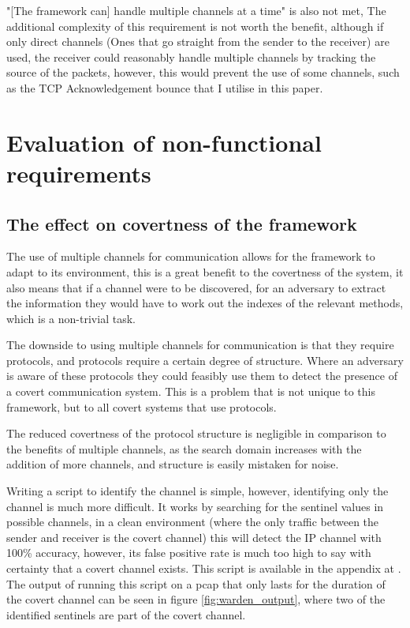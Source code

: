 "[The framework can] handle multiple channels at a time" is also not met, The additional complexity of this requirement is not worth the benefit, although if only direct channels (Ones that go straight from the sender to the receiver) are used, the receiver could reasonably handle multiple channels by tracking the source of the packets, however, this would prevent the use of some channels, such as the TCP Acknowledgement bounce that I utilise in this paper.

\section{Evaluation of non-functional requirements}

\subsection{The effect on covertness of the framework}

The use of multiple channels for communication allows for the framework to adapt to its environment, this is a great benefit to the covertness of the system, it also means that if a channel were to be discovered, for an adversary to extract the information they would have to work out the indexes of the relevant methods, which is a non-trivial task. 

The downside to using multiple channels for communication is that they require protocols, and protocols require a certain degree of structure. Where an adversary is aware of these protocols they could feasibly use them to detect the presence of a covert communication system. This is a problem that is not unique to this framework, but to all covert systems that use protocols.

The reduced covertness of the protocol structure is negligible in comparison to the benefits of multiple channels, as the search domain increases with the addition of more channels, and structure is easily mistaken for noise.

Writing a script to identify the channel is simple, however, identifying only the channel is much more difficult. It works by searching for the sentinel values in possible channels, in a clean environment (where the only traffic between the sender and receiver is the covert channel) this will detect the IP channel with 100\% accuracy, however, its false positive rate is much too high to say with certainty that a covert channel exists. This script is available in the appendix at . The output of running this script on a pcap that only lasts for the duration of the covert channel can be seen in figure \ref{fig:warden_output}, where two of the identified sentinels are part of the covert channel.

